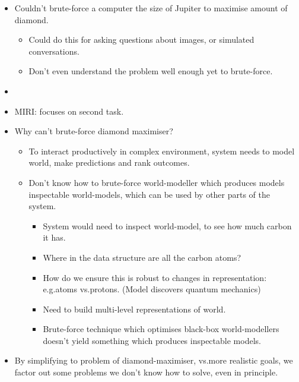 \begin{itemize}
    \item Couldn't brute-force a computer the size of Jupiter to maximise amount of diamond.
    \begin{itemize}
        \item Could do this for asking questions about images, or simulated conversations.
        \item Don't even understand the problem well enough yet to brute-force.
    \end{itemize}
    \item {}
    \item MIRI: focuses on second task.
    \item Why can't brute-force diamond maximiser?
    \begin{itemize}
        \item To interact productively in complex environment, system needs to model world, make predictions and rank outcomes.
        \item Don't know how to brute-force world-modeller which produces models inspectable world-models, which can be used by other parts of the system.
        \begin{itemize}
            \item System would need to inspect world-model, to see how much carbon it has.
            \item Where in the data structure are all the carbon atoms?
            \item How do we ensure this is robust to changes in representation: e.g.\@ atoms vs.\@ protons. (Model discovers quantum mechanics)
            \item Need to build multi-level representations of world.
            \item Brute-force technique which optimises black-box world-modellers doesn't yield something which produces inspectable models.
        \end{itemize}
    \end{itemize}
    \item By simplifying to problem of diamond-maximiser, vs.\@ more realistic goals, we factor out some problems we don't know how to solve, even in principle.
\end{itemize}


